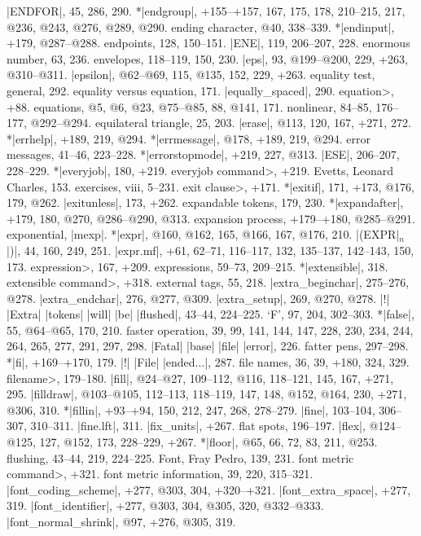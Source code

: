 |ENDFOR|, 45, 286, 290.
*|endgroup|, +155--+157, 167, 175, 178, 210--215, 217, @236, @243,
 @276, @289, @290.
ending character, @40, 338--339.
*|endinput|, +179, @287--@288.
endpoints, 128, 150--151.
|ENE|, 119, 206--207, 228.
enormous number, 63, 236.
envelopes, 118--119, 150, 230.
|eps|, 93, @199--@200, 229, +263, @310--@311.
|epsilon|, @62--@69, 115, @135, 152, 229, +263.
equality test, general, 292.
equality versus equation, 171.
|equally_spaced|, 290.
\<equation>, +88.
equations, @5, @6, @23, @75--@85, 88, @141, 171.
\sub nonlinear, 84--85, 176--177, @292--@294.
equilateral triangle, 25, 203.
|erase|, @113, 120, 167, +271, 272.
*|errhelp|, +189, 219, @294.
*|errmessage|, @178, +189, 219, @294.
error messages, 41--46, 223--228.
*|errorstopmode|, +219, 227, @313.
|ESE|, 206--207, 228--229.
*|everyjob|, 180, +219.
\<everyjob command>, +219.
Evetts, Leonard Charles, 153.
exercises, viii, 5--231.
\<exit clause>, +171.
*|exitif|, 171, +173, @176, 179, @262.
|exitunless|, 173, +262.
expandable tokens, 179, 230.
*|expandafter|, +179, 180, @270, @286--@290, @313.
expansion process, +179--+180, @285--@291.
exponential, \see |mexp|.
*|expr|, @160, @162, 165, @166, 167, @176, 210.
|(EXPR|$_n$|)|, 44, 160, 249, 251.
|expr.mf|, +61, 62--71, 116--117, 132, 135--137, 142--143, 150, 173.
\<expression>, 167, +209.
expressions, 59--73, 209--215.
*|extensible|, 318.
\<extensible command>, +318.
external tags, 55, 218.
|extra_beginchar|, 275--276, @278.
|extra_endchar|, 276, @277, @309.
|extra_setup|, 269, @270, @278.
|!| |Extra| |tokens| |will| |be| |flushed|, 43--44, 224--225.
\newletter
`F', 97, 204, 302--303.
*|false|, 55, @64--@65, 170, 210.
faster operation, 39, 99, 141, 144, 147, 228, 230, 234, 244, 264, 265, 277,
 291, 297, 298.
|Fatal| |base| |file| |error|, 226.
fatter pens, 297--298.
*|fi|, +169--+170, 179.
|!| |File| |ended...|, 287.
file names, 36, 39, +180, 324, 329.
\<filename>, 179--180.
|fill|, @24--@27, 109--112, @116, 118--121, 145, 167, +271, 295.
|filldraw|, @103--@105, 112--113, 118--119, 147, 148, @152, @164,
 230, +271, @306, 310.
*|fillin|, +93--+94, 150, 212, 247, 268, 278--279.
|fine|, 103--104, 306--307, 310--311.
|fine.lft|, 311.
|fix_units|, +267.
flat spots, 196--197.
|flex|, @124--@125, 127, @152, 173, 228--229, +267.
*|floor|, @65, 66, 72, 83, 211, @253.
flushing, 43--44, 219, 224--225.
Font, Fray Pedro, 139, 231.
\<font metric command>, +321.
font metric information, 39, 220, 315--321.
|font_coding_scheme|, +277, @303, 304, +320--+321.
|font_extra_space|, +277, 319.
|font_identifier|, +277, @303, 304, @305, 320, @332--@333.
|font_normal_shrink|, @97, +276, @305, 319.

